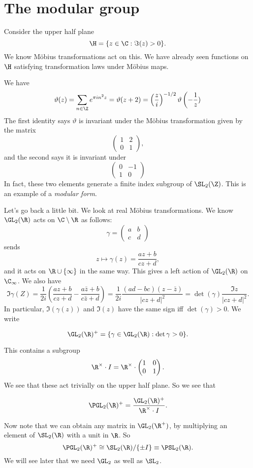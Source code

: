 \documentclass[a4paper]{article}
\begin{document}
\section{The modular group}
Consider the upper half plane
\[
  \H = \{z \in \C: \Im (z) > 0\}.
\]
We know M\"obius transformations act on this. We have already seen functions on $\H$ satisfying transformation laws under M\"obius maps.
\begin{eg}
  We have
  \[
    \vartheta(z) = \sum_{n \in \Z} e^{\pi i n^2 z} = \vartheta(z + 2) = \left(\frac{z}{i}\right)^{-1/2} \vartheta\left(-\frac{1}{z})\right.
  \]
  The first identity says $\vartheta$ is invariant under the M\"obius transformation given by the matrix
  \[
    \begin{pmatrix}
      1 & 2 \\
      0 & 1
    \end{pmatrix},
  \]
  and the second says it is invariant under
  \[
    \begin{pmatrix}
      0 & -1\\
      1 & 0
    \end{pmatrix}
  \]
  In fact, these two elements generate a finite index subgroup of $\SL_2(\Z)$. This is an example of a \emph{modular form}.
\end{eg}
Let's go back a little bit. We look at real M\"obius transformations. We know $\GL_2(\R)$ acts on $\C \setminus \R$ as follows:
\[
  \gamma =
  \begin{pmatrix}
    a & b\\
    c & d
  \end{pmatrix}
\]
sends
\[
  z \mapsto \gamma(z) = \frac{az + b}{cz + d},
\]
and it acts on $\R \cup \{\infty\}$ in the same way. This gives a left action of $\GL_2(\R)$ on $\C_\infty$. We also have
\[
  \Im \gamma(Z) = \frac{1}{2i} \left(\frac{az + b}{cz + d} - \frac{a\bar{z} + b}{c \bar{z} + d}\right) = \frac{1}{2i} \frac{(ad - bc) (z - \bar{z})}{|cz + d|^2} = \det(\gamma) \frac{\Im z}{ |cz + d|^2}.
\]
In particular, $\Im(\gamma(z))$ and $\Im(z)$ have the same sign iff $\det(\gamma) > 0$. We write
\begin{defi}[$\GL_2(\R)^+$]
  \[
    \GL_2(\R)^+ = \{\gamma \in \GL_2(\R) : \det \gamma > 0\}.
  \]
\end{defi}
This contains a subgroup
\[
  \R^\times \cdot I = \R^\times \cdot
  \begin{pmatrix}
    1 & 0\\
    0 & 1
  \end{pmatrix}.
\]
We see that these act trivially on the upper half plane. So we see that
\begin{defi}[$\PGL_2(\R)^+$]
  \[
    \PGL_2(\R)^+ = \frac{\GL_2(\R)^+}{\R^\times \cdot I}.
  \]
\end{defi}
Now note that we can obtain any matrix in $\GL_2(\R^+)$, by multiplying an element of $\SL_2(\R)$ with a unit in $\R$. So 
\[
  \PGL_2(\R)^+ \cong \SL_2(\R)/\{\pm I\} \equiv \PSL_2(\R).
\]
We will see later that we need $\GL_2$ as well as $\SL_2$.
\end{document}
